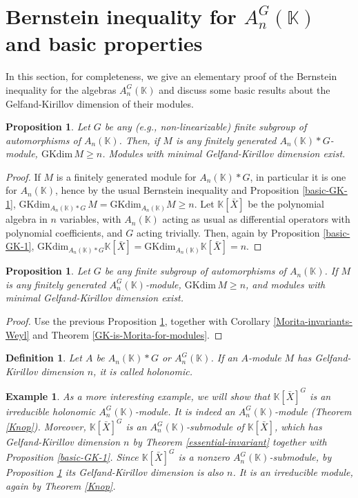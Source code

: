 \documentclass[12pt, a4paper]{amsart}
\newtheorem{proposition}[theorem]{Proposition}
\newtheorem{definition}[theorem]{Definition}
\newtheorem{example}[theorem]{Example}
\newcommand{\Weyl}{A_n(\mathbb{K})} %
\newcommand{\Invar}{A_n^G(\mathbb{K})}           %
\newcommand{\GKdim}{\text{GKdim}}    %
\def\k{\mathbb K}
\def\k{\mathbb K}
\def\KK{\mathbb K}
\begin{document}
\section{Bernstein inequality for $\Invar$ and basic properties}
In this section, for completeness, we give an elementary proof of the Bernstein inequality for the algebras $\Invar$ and discuss some basic results about the Gelfand-Kirillov dimension of their modules.
\begin{proposition}\label{Bernstein-skew-product-ring}
    Let $G$ be \textit{any} (e.g., non-linearizable) finite subgroup of automorphisms of $\Weyl$. Then, if $M$ is any finitely generated $\Weyl*G$-module, $\GKdim \, M \geq n$. Modules with minimal Gelfand-Kirillov dimension exist.
\end{proposition}
\begin{proof}
    If $M$ is a finitely generated module for $\Weyl*G$, in particular it is one for $\Weyl$, hence by the usual Bernstein inequality and Proposition \ref{basic-GK-1}, $\GKdim_{\Weyl*G} \, M = \GKdim_{\Weyl} M \geq n$. Let $\KK[\bar{X}]$ be the polynomial algebra in $n$ variables, with $\Weyl$ acting as usual as differential operators with polynomial coefficients, and $G$ acting trivially. Then, again by Proposition \ref{basic-GK-1}, $\GKdim_{\Weyl*G} \KK[\bar{X}]=\GKdim_{\Weyl} \KK[\bar{X}]=n$.
\end{proof}
\begin{proposition}\label{Bernstein-invariants}
Let $G$ be any finite subgroup of automorphisms of $\Weyl$. If $M$ is any finitely generated $\Invar$-module, $\GKdim \, M \geq n$, and modules with minimal Gelfand-Kirillov dimension exist.
\end{proposition}
\begin{proof}
    Use the previous Proposition \ref{Bernstein-skew-product-ring}, together with Corollary \ref{Morita-invariants-Weyl} and Theorem \ref{GK-is-Morita-for-modules}.
\end{proof}
\begin{definition}
    Let $A$ be $\Weyl*G$ or $\Invar$. If an $A$-module $M$ has Gelfand-Kirillov dimension $n$, it is called holonomic.
\end{definition}
\begin{example}
    As a more interesting example, we will show that $\k[\bar{X}]^G$ is an irreducible holonomic $\Invar$-module. It is indeed an $\Invar$-module (Theorem \ref{Knop}). Moreover, $\k[\bar{X}]^G$ is an $\Invar$-submodule of $\k[\bar{X}]$, which has Gelfand-Kirillov dimension $n$ by Theorem \ref{essential-invariant} together with Proposition \ref{basic-GK-1}. Since $\k[\bar{X}]^G$ is a nonzero $\Invar$-submodule, by Proposition \ref{Bernstein-invariants} its Gelfand-Kirillov dimension is also $n$. It is an irreducible module, again by Theorem \ref{Knop}.
\end{example}
\end{document}
